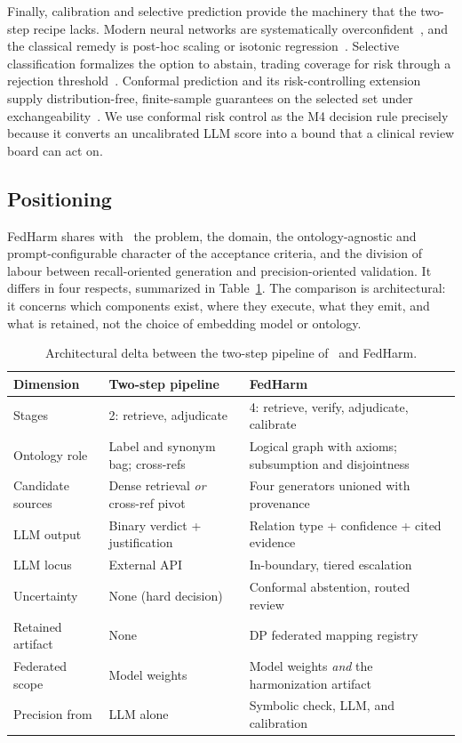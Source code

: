 \documentclass[conference]{IEEEtran}
\begin{document}
Finally, calibration and selective prediction provide the machinery that the two-step recipe lacks. Modern neural networks are systematically overconfident~\cite{b19}, and the classical remedy is post-hoc scaling or isotonic regression~\cite{b19,b47}. Selective classification formalizes the option to abstain, trading coverage for risk through a rejection threshold~\cite{b20,b21}. Conformal prediction and its risk-controlling extension supply distribution-free, finite-sample guarantees on the selected set under exchangeability~\cite{b23,b50,b22}. We use conformal risk control as the M4 decision rule precisely because it converts an uncalibrated LLM score into a bound that a clinical review board can act on.

\subsection{Positioning}

FedHarm shares with~\cite{b1} the problem, the domain, the ontology-agnostic and prompt-configurable character of the acceptance criteria, and the division of labour between recall-oriented generation and precision-oriented validation. It differs in four respects, summarized in Table~\ref{tab:delta}. The comparison is architectural: it concerns which components exist, where they execute, what they emit, and what is retained, not the choice of embedding model or ontology.

\begin{table}[t]
\caption{Architectural delta between the two-step pipeline of~\cite{b1} and FedHarm.}
\label{tab:delta}
\centering
\footnotesize
\begin{tabular}{@{}p{1.75cm}p{2.75cm}p{2.9cm}@{}}
\toprule
\textbf{Dimension} & \textbf{Two-step pipeline~\cite{b1}} & \textbf{FedHarm} \\
\midrule
Stages & 2: retrieve, adjudicate & 4: retrieve, verify, adjudicate, calibrate \\
Ontology role & Label and synonym bag; cross-refs & Logical graph with axioms; subsumption and disjointness \\
Candidate sources & Dense retrieval \emph{or} cross-ref pivot & Four generators unioned with provenance \\
LLM output & Binary verdict + justification & Relation type + confidence + cited evidence \\
LLM locus & External API & In-boundary, tiered escalation \\
Uncertainty & None (hard decision) & Conformal abstention, routed review \\
Retained artifact & None & DP federated mapping registry \\
Federated scope & Model weights & Model weights \emph{and} the harmonization artifact \\
Precision from & LLM alone & Symbolic check, LLM, and calibration \\
\bottomrule
\end{tabular}
\end{table}
\end{document}
